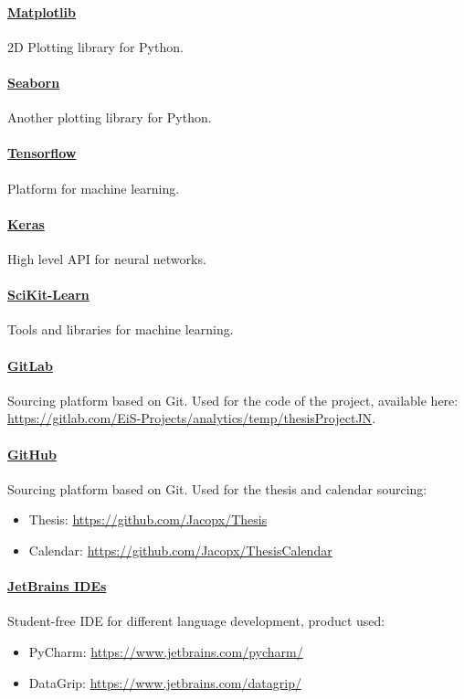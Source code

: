 \documentclass[%
    corpo=12pt,
    twoside,
    oldstyle,
    autoretitolo,
    greek,
    evenboxes,
]{toptesi}
\begin{document}
\paragraph{\href{https://matplotlib.org/}{Matplotlib}} 2D Plotting library for Python.

\paragraph{\href{https://seaborn.pydata.org/}{Seaborn}} Another plotting library for Python.

\paragraph{\href{https://www.tensorflow.org/}{Tensorflow}} Platform for machine learning.

\paragraph{\href{https://keras.io/}{Keras}} High level API for neural networks.

\paragraph{\href{https://scikit-learn.org/stable/}{SciKit-Learn}} Tools and libraries for machine learning.

\paragraph{\href{https://gitlab.com}{GitLab}} Sourcing platform based on Git. Used for the code of the project, available here: \url{https://gitlab.com/EiS-Projects/analytics/temp/thesisProjectJN}.

\paragraph{\href{https://github.com}{GitHub}} Sourcing platform based on Git. Used for the thesis and calendar sourcing:
\begin{itemize}
  \item Thesis: \url{https://github.com/Jacopx/Thesis}
  \item Calendar: \url{https://github.com/Jacopx/ThesisCalendar}
\end{itemize}

\paragraph{\href{https://www.jetbrains.com/}{JetBrains IDEs}} Student-free IDE for different language development, product used:
\begin{itemize}
  \item PyCharm: \url{https://www.jetbrains.com/pycharm/}
  \item DataGrip: \url{https://www.jetbrains.com/datagrip/}
\end{itemize}
\end{document}
